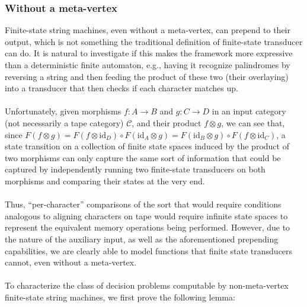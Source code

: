\documentclass{article}
\theoremstyle{definition}
\theoremstyle{remark}
\begin{document}
\subsubsection{Without a meta-vertex}
Finite-state string machines, even without a meta-vertex, can prepend
to their output, which is not something the traditional definition
of finite-state transducer can do. It is natural to
investigate if this makes the
framework more expressive than a
deterministic finite automaton, e.g., having it
recognize palindromes by reversing a string and then feeding the product
of these two (their overlaying) into a transducer that then checks if
each character matches up.
\\ \\
Unfortunately, given morphisms
$f:A\to B$ and $g:C\to D$ in an input category (not necessarily
a tape category)
$\mathcal{C}$, and their product $f\otimes g$, we can see that,
since $F(f\otimes g) = F(f\otimes \mathrm{id}_D) \circ F(\mathrm{id}_A
\otimes g)=F(\mathrm{id}_B \otimes g)\circ F(f \otimes \mathrm{id}_C)$,
a state transition on a collection of finite state spaces induced 
by the product of two morphisms can only capture the same sort of information
that could be captured by independently running two finite-state
transducers on both morphisms and comparing their states at the very end.
\\ \\
Thus, ``per-character'' comparisons of the sort that would require
conditions analogous to
aligning characters on tape would require infinite state spaces to
represent the equivalent memory operations being performed. However, due
to the nature of the auxiliary input, as
well as the aforementioned prepending
capabilities, we are clearly able to model
functions that finite state transducers cannot, even without a meta-vertex.
\\ \\
To characterize the class of decision
problems computable by non-meta-vertex
finite-state string machines, we first prove the following lemma:
\end{document}
